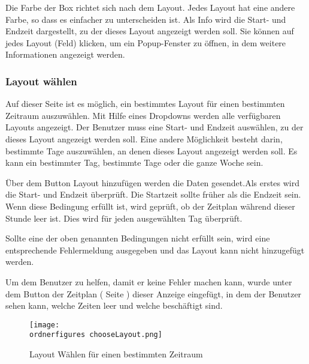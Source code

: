 Die Farbe der Box richtet sich nach dem Layout. Jedes Layout hat eine andere Farbe, so dass es einfacher zu unterscheiden ist.
Als Info wird die Start- und Endzeit dargestellt, zu der dieses Layout angezeigt werden soll. 
Sie können auf jedes Layout (Feld) klicken, um ein Popup-Fenster zu öffnen, in dem weitere Informationen angezeigt werden.

\subsubsection{Layout wählen}

Auf dieser Seite ist es möglich, ein bestimmtes Layout für einen bestimmten Zeitraum auszuwählen. Mit Hilfe eines Dropdowns werden alle verfügbaren Layouts angezeigt. Der Benutzer muss eine Start- und Endzeit auswählen, zu der dieses Layout angezeigt werden soll. Eine andere Möglichkeit besteht darin, bestimmte Tage auszuwählen, an denen dieses Layout angezeigt werden soll. Es kann ein bestimmter Tag, bestimmte Tage oder die ganze Woche sein.

Über dem Button Layout hinzufügen werden die Daten gesendet.Als erstes wird die Start- und Endzeit überprüft. Die Startzeit sollte früher als die Endzeit sein. Wenn diese Bedingung erfüllt ist, wird geprüft, ob der Zeitplan während dieser Stunde leer ist. Dies wird für jeden ausgewählten Tag überprüft.

Sollte eine der oben genannten Bedingungen nicht erfüllt sein, wird eine entsprechende Fehlermeldung ausgegeben und das Layout kann nicht hinzugefügt werden.

Um dem Benutzer zu helfen, damit er keine Fehler machen kann, wurde unter dem Button der Zeitplan ( Seite \pageref{sub:timetable}) dieser Anzeige eingefügt, in dem der Benutzer sehen kann, welche Zeiten leer und welche beschäftigt sind.

\begin{figure}[H]
	\centering
	\texttt{[image: \\ordnerfigures chooseLayout.png]}
	\caption{Layout Wählen für einen bestimmten Zeitraum}
	\label{fi:chooseLayout}
\end{figure}

